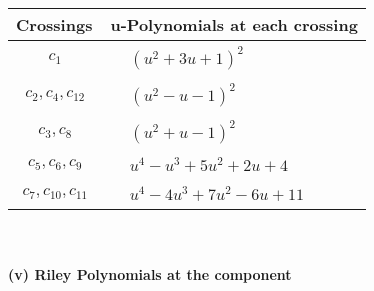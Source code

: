 \documentclass[1p]{elsarticle_modified}
\theoremstyle{definition}
\begin{document}
\begin{tabular}{m{50pt}|m{274pt}}
Crossings & \hspace{64pt}u-Polynomials at each crossing \\
\hline $$\begin{aligned}c_{1}\end{aligned}$$&$\begin{aligned}
&(u^2+3 u+1)^2
\end{aligned}$\\
\hline $$\begin{aligned}c_{2},c_{4},c_{12}\end{aligned}$$&$\begin{aligned}
&(u^2- u-1)^2
\end{aligned}$\\
\hline $$\begin{aligned}c_{3},c_{8}\end{aligned}$$&$\begin{aligned}
&(u^2+u-1)^2
\end{aligned}$\\
\hline $$\begin{aligned}c_{5},c_{6},c_{9}\end{aligned}$$&$\begin{aligned}
&u^4- u^3+5 u^2+2 u+4
\end{aligned}$\\
\hline $$\begin{aligned}c_{7},c_{10},c_{11}\end{aligned}$$&$\begin{aligned}
&u^4-4 u^3+7 u^2-6 u+11
\end{aligned}$\\
\hline
\end{tabular}\\~\\
\newpage\renewcommand{\arraystretch}{1}
\flushleft \textbf{(v) Riley Polynomials at the component}\newline \\
\end{document}
